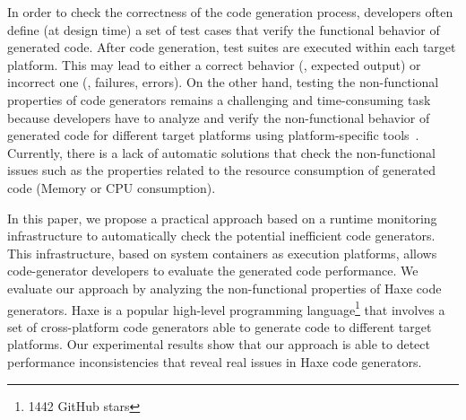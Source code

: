 In order to check the correctness of the code generation process, developers often define (at design time) a set of test cases that verify the functional behavior of generated code. After code generation, test suites are executed within each target platform. This may lead to either a correct behavior (\ie, expected output) or incorrect one (\ie, failures, errors).
On the other hand, testing the non-functional properties of code generators remains a challenging and time-consuming task because developers have to analyze and verify the non-functional behavior of generated code for different target platforms using platform-specific tools~\cite{guana2014chaintracker,delgado2004taxonomy}. Currently, there is a lack of automatic solutions that check the non-functional issues such as the properties related to the resource consumption of generated code (Memory or CPU consumption).



In this paper, we propose a practical approach based on a runtime monitoring infrastructure to automatically check the potential inefficient code generators. This infrastructure, based on system containers as execution platforms, allows code-generator developers to evaluate the generated code performance. %
We evaluate our approach by analyzing the non-functional properties of Haxe code generators. Haxe is a popular high-level programming language\footnote{\num{1442} GitHub stars} that involves a set of cross-platform code generators able to generate code to different target platforms. Our experimental results show that our approach is able to detect performance inconsistencies that reveal real issues in Haxe code generators.




